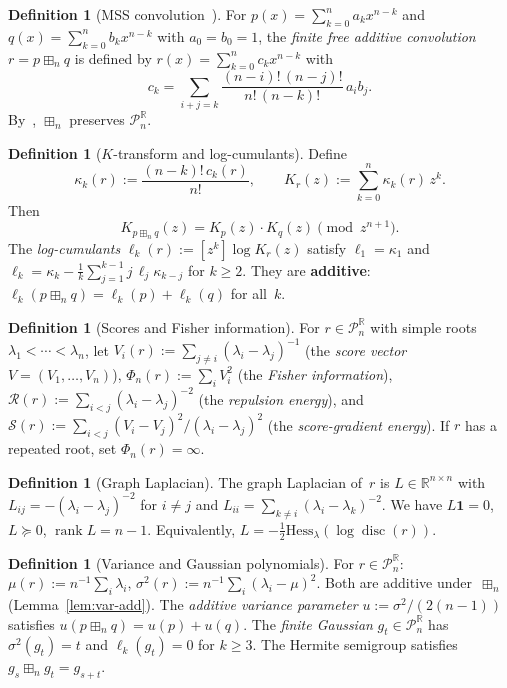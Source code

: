 \documentclass[10pt,a4paper]{amsart}
\theoremstyle{plain}
\theoremstyle{definition}
\newtheorem{definition}[theorem]{Definition}
\theoremstyle{remark}
\newcommand{\R}{\mathbb{R}}
\newcommand{\PnR}[1][n]{\mathcal{P}^{\R}_{#1}}
\newcommand{\fp}{\boxplus_n}
\DeclareMathOperator{\disc}{disc}
\DeclareMathOperator{\rank}{rank}
\begin{document}
\begin{definition}[MSS convolution~\cite{MSS2}]
\label{def:mss}
For $p(x)=\sum_{k=0}^n a_k x^{n-k}$ and $q(x)=\sum_{k=0}^n b_k x^{n-k}$ with $a_0=b_0=1$,
the \emph{finite free additive convolution} $r=p\fp q$ is defined by $r(x)=\sum_{k=0}^n c_k x^{n-k}$ with
\[
  c_k=\sum_{i+j=k}\frac{(n-i)!\,(n-j)!}{n!\,(n-k)!}\,a_i b_j.
\]
By~\cite{MSS2}, $\fp$ preserves $\PnR$.
\end{definition}

\begin{definition}[$K$-transform and log-cumulants]
\label{def:K}
Define
\[
  \kappa_k(r):=\frac{(n-k)!\,c_k(r)}{n!},
  \qquad
  K_r(z):=\sum_{k=0}^{n}\kappa_k(r)\,z^k.
\]
Then
\[
  K_{p\fp q}(z)=K_p(z)\cdot K_q(z)\pmod{z^{n+1}}.
\]
The \emph{log-cumulants} $\ell_k(r):=[z^k]\log K_r(z)$
satisfy $\ell_1=\kappa_1$ and
$\ell_k=\kappa_k-\tfrac{1}{k}\sum_{j=1}^{k-1}j\,\ell_j\kappa_{k-j}$
for $k\ge 2$.
They are \textbf{additive}:
$\ell_k(p\fp q)=\ell_k(p)+\ell_k(q)$ for all~$k$.
\end{definition}

\begin{definition}[Scores and Fisher information]
\label{def:scores}
For $r\in\PnR$ with simple roots
$\lambda_1<\cdots<\lambda_n$, let
$V_i(r):=\sum_{j\ne i}(\lambda_i-\lambda_j)^{-1}$
(the \emph{score vector} $V=(V_1,\ldots,V_n)$),
$\Phi_n(r):=\sum_i V_i^2$ (the \emph{Fisher information}),
$\mathcal{R}(r):=\sum_{i<j}(\lambda_i-\lambda_j)^{-2}$
(the \emph{repulsion energy}),
and $\mathcal{S}(r):=\sum_{i<j}(V_i-V_j)^2/(\lambda_i-\lambda_j)^2$
(the \emph{score-gradient energy}).
If $r$ has a repeated root, set $\Phi_n(r)=\infty$.
\end{definition}

\begin{definition}[Graph Laplacian]\label{def:laplacian}
The graph Laplacian of~$r$ is $L\in\R^{n\times n}$ with
$L_{ij}=-(\lambda_i-\lambda_j)^{-2}$ for $i\ne j$ and
$L_{ii}=\sum_{k\ne i}(\lambda_i-\lambda_k)^{-2}$.
We have $L\mathbf{1}=0$, $L\succeq 0$, $\rank L=n-1$.
Equivalently, $L=-\tfrac{1}{2}\mathrm{Hess}_\lambda(\log\disc(r))$.
\end{definition}

\begin{definition}[Variance and Gaussian polynomials]
\label{def:var}
For $r\in\PnR$: $\mu(r):=n^{-1}\sum_i\lambda_i$,
$\sigma^2(r):=n^{-1}\sum_i(\lambda_i-\mu)^2$.
Both are additive under~$\fp$
(Lemma~\ref{lem:var-add}).
The \emph{additive variance parameter}
$u:=\sigma^2/(2(n-1))$ satisfies
$u(p\fp q)=u(p)+u(q)$.
The \emph{finite Gaussian} $g_t\in\PnR$ has
$\sigma^2(g_t)=t$ and $\ell_k(g_t)=0$ for $k\ge 3$.
The Hermite semigroup satisfies $g_s\fp g_t=g_{s+t}$.
\end{definition}
\end{document}
